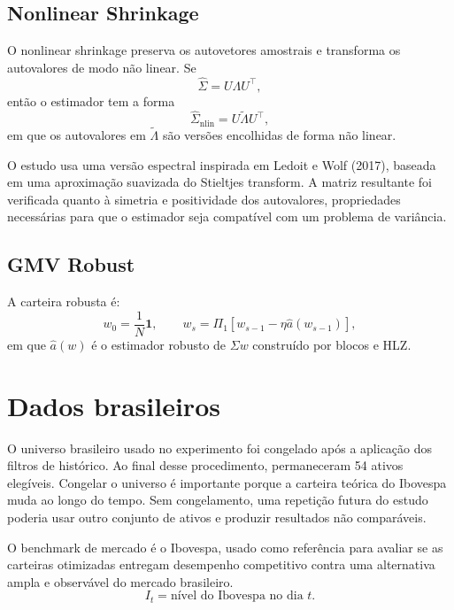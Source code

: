 \documentclass[12pt,a4paper]{article}
\newcommand{\one}{\mathbf{1}}
\newcommand{\Sigmahat}{\widehat{\Sigma}}
\begin{document}
\subsection{Nonlinear Shrinkage}

O nonlinear shrinkage preserva os autovetores amostrais e transforma os autovalores de modo
não linear. Se
\begin{equation}
  \Sigmahat = U \Lambda U^\top,
\end{equation}
então o estimador tem a forma
\begin{equation}
  \Sigmahat_{\mathrm{nlin}}
  =
  U \widetilde\Lambda U^\top,
\end{equation}
em que os autovalores em $\widetilde\Lambda$ são versões encolhidas de forma não linear.

O estudo usa uma versão espectral inspirada em Ledoit e Wolf (2017), baseada em uma
aproximação suavizada do Stieltjes transform. A matriz resultante foi verificada quanto à
simetria e positividade dos autovalores, propriedades necessárias para que o estimador seja
compatível com um problema de variância.

\subsection{GMV Robust}

A carteira robusta é:
\begin{equation}
  w_0 = \frac{1}{N}\one,
  \qquad
  w_s
  =
  \Pi_1
  \left[
    w_{s-1}
    -
    \eta \widehat a(w_{s-1})
  \right],
\end{equation}
em que $\widehat a(w)$ é o estimador robusto de $\Sigma w$ construído por blocos e HLZ.

\section{Dados brasileiros}

O universo brasileiro usado no experimento foi congelado após a aplicação dos filtros de
histórico. Ao final desse procedimento, permaneceram 54 ativos elegíveis. Congelar o universo
é importante porque a carteira teórica do Ibovespa muda ao longo do tempo. Sem congelamento,
uma repetição futura do estudo poderia usar outro conjunto de ativos e produzir resultados
não comparáveis.

O benchmark de mercado é o Ibovespa, usado como referência para avaliar se as carteiras
otimizadas entregam desempenho competitivo contra uma alternativa ampla e observável do
mercado brasileiro.
\begin{equation}
  I_t = \text{nível do Ibovespa no dia } t.
\end{equation}
\end{document}
